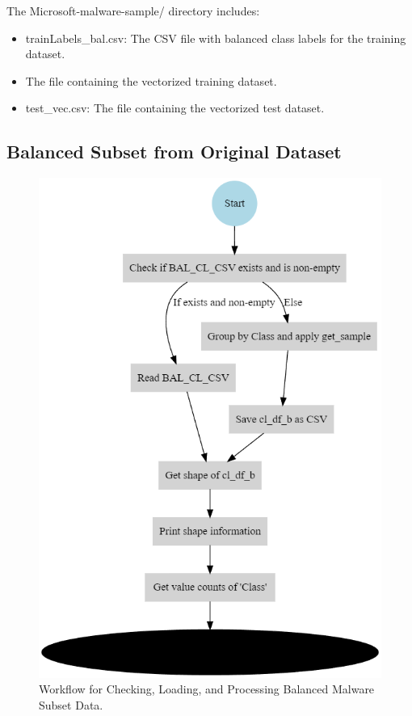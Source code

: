 \documentclass[conference]{IEEEtran}
\begin{document}
The Microsoft-malware-sample/ directory includes:
\begin{itemize}
    \item trainLabels\_bal.csv: The CSV file with balanced class labels for the training dataset.
    \item The file containing the vectorized training dataset.
    \item test\_vec.csv: The file containing the vectorized test dataset.
\end{itemize}

\subsection{Balanced Subset from Original Dataset}

\begin{figure}[h]
    \centerline{\includegraphics[width=0.7\linewidth]{fig6}}
    \caption{Workflow for Checking, Loading, and Processing Balanced Malware Subset Data.}
    \label{fig6}
\end{figure}
\end{document}
